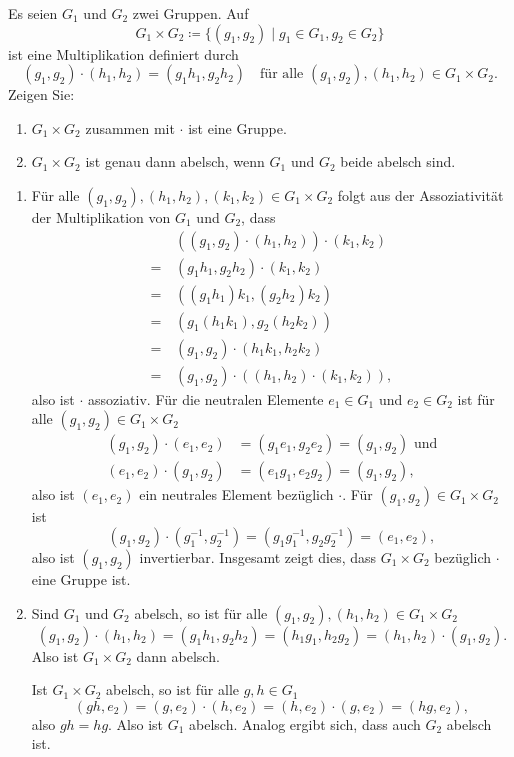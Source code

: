 \begin{question}
 Es seien $G_1$ und $G_2$ zwei Gruppen. Auf
 \[
  G_1 \times G_2 \coloneqq \{(g_1, g_2) \mid g_1 \in G_1, g_2 \in G_2\}
 \]
 ist eine Multiplikation definiert durch
 \[
  (g_1, g_2) \cdot (h_1, h_2) = (g_1 h_1, g_2 h_2)
  \quad
  \text{für alle $(g_1, g_2), (h_1, h_2) \in G_1 \times G_2$}.
 \]
 Zeigen Sie:
 \begin{enumerate}
  \item
   $G_1 \times G_2$ zusammen mit $\cdot$ ist eine Gruppe.
  \item
   $G_1 \times G_2$ ist genau dann abelsch, wenn $G_1$ und $G_2$ beide abelsch sind.
 \end{enumerate}
\end{question}
\begin{solution}
 \begin{enumerate}
  \item
   Für alle $(g_1, g_2), (h_1, h_2), (k_1, k_2) \in G_1 \times G_2$ folgt aus der Assoziativität der Multiplikation von $G_1$ und $G_2$, dass
   \begin{align*}
     &\, ((g_1, g_2) \cdot (h_1, h_2)) \cdot (k_1, k_2) \\
    =&\, (g_1 h_1, g_2 h_2) \cdot (k_1, k_2) \\
    =&\, ((g_1 h_1) k_1, (g_2 h_2) k_2) \\
    =&\, (g_1 (h_1 k_1), g_2 (h_2 k_2)) \\
    =&\, (g_1, g_2) \cdot (h_1 k_1, h_2 k_2) \\
    =&\, (g_1, g_2) \cdot ((h_1, h_2) \cdot (k_1, k_2)),
   \end{align*}
   also ist $\cdot$ assoziativ. Für die neutralen Elemente $e_1 \in G_1$ und $e_2 \in G_2$ ist für alle $(g_1, g_2) \in G_1 \times G_2$
   \begin{align*}
    (g_1, g_2) \cdot (e_1, e_2) &= (g_1 e_1, g_2 e_2) = (g_1, g_2) \text{ und} \\
    (e_1, e_2) \cdot (g_1, g_2) &= (e_1 g_1, e_2 g_2) = (g_1, g_2),
   \end{align*}
   also ist $(e_1, e_2)$ ein neutrales Element bezüglich $\cdot$. Für $(g_1, g_2) \in G_1 \times G_2$ ist
   \[
    (g_1, g_2) \cdot (g_1^{-1}, g_2^{-1})
    = (g_1 g_1^{-1}, g_2 g_2^{-1})
    = (e_1, e_2),
   \]
   also ist $(g_1, g_2)$ invertierbar. Insgesamt zeigt dies, dass $G_1 \times G_2$ bezüglich $\cdot$ eine Gruppe ist.
  \item
   Sind $G_1$ und $G_2$ abelsch, so ist für alle $(g_1, g_2), (h_1, h_2) \in G_1 \times G_2$
   \[
    (g_1, g_2) \cdot (h_1, h_2)
    = (g_1 h_1, g_2 h_2)
    = (h_1 g_1, h_2 g_2)
    = (h_1, h_2) \cdot (g_1, g_2).
   \]
   Also ist $G_1 \times G_2$ dann abelsch.
   
   Ist $G_1 \times G_2$ abelsch, so ist für alle $g,h \in G_1$
   \[
    (gh, e_2)
    = (g, e_2) \cdot (h, e_2) 
    = (h, e_2) \cdot (g, e_2)
    = (hg, e_2),
   \]
   also $gh = hg$. Also ist $G_1$ abelsch. Analog ergibt sich, dass auch $G_2$ abelsch ist.
 \end{enumerate}
\end{solution}


